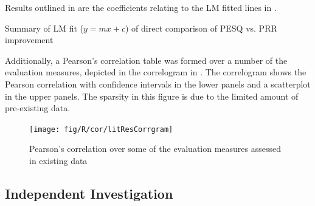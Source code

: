 Results outlined in  are the
coefficients relating to the \ac{LM} fitted lines in .

\begin{table}[h]
\protect\caption{\label{tab:LF-Fit-Direct-Compar-PESQ-PRR}Summary of \acs{LM} fit
($y=mx+c$) of direct comparison of \acs{PESQ} vs. \acs{PRR} improvement}


\centering{}
\end{table}


Additionally, a Pearson's correlation table was formed over a number
of the evaluation measures, depicted in the correlogram in .
The correlogram shows the Pearson correlation with confidence intervals
in the lower panels and a scatterplot in the upper panels. The sparsity
in this figure is due to the limited amount of pre-existing data.

\begin{figure}[h]
\noindent \begin{centering}
\texttt{[image: fig/R/cor/litResCorrgram]}
\par\end{centering}

\protect\caption{\label{fig:litResCorr}Pearson's correlation over some of the evaluation
measures assessed in existing data}
\end{figure}


\clearpage{}


\subsection{Independent Investigation}

